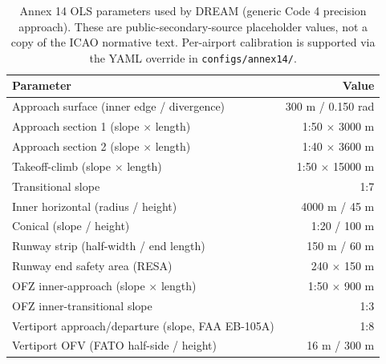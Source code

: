 \begin{table}[t]
\centering
\caption{Annex 14 OLS parameters used by DREAM (generic Code 4 precision approach). These are public-secondary-source placeholder values, not a copy of the ICAO normative text. Per-airport calibration is supported via the YAML override in \texttt{configs/annex14/}.}
\label{tab:ols-params}
\begin{tabular}{lr}
\toprule
Parameter & Value \\
\midrule
Approach surface (inner edge / divergence) & 300 m / 0.150 rad \\
Approach section 1 (slope $\times$ length) & 1:50 $\times$ 3000 m \\
Approach section 2 (slope $\times$ length) & 1:40 $\times$ 3600 m \\
Takeoff-climb (slope $\times$ length) & 1:50 $\times$ 15000 m \\
Transitional slope & 1:7 \\
Inner horizontal (radius / height) & 4000 m / 45 m \\
Conical (slope / height) & 1:20 / 100 m \\
Runway strip (half-width / end length) & 150 m / 60 m \\
Runway end safety area (RESA) & 240 $\times$ 150 m \\
OFZ inner-approach (slope $\times$ length) & 1:50 $\times$ 900 m \\
OFZ inner-transitional slope & 1:3 \\
Vertiport approach/departure (slope, FAA EB-105A) & 1:8 \\
Vertiport OFV (FATO half-side / height) & 16 m / 300 m \\
\bottomrule
\end{tabular}
\end{table}
